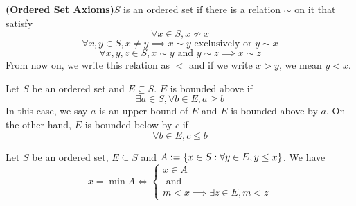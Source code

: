 \documentclass{report}
\begin{document}
\begin{definition}
\textbf{(Ordered Set Axioms)}$S$ is an ordered set if there is a relation $\sim$ on it that satisfy 
\begin{equation}
\forall x\in S, x\not\sim x
\end{equation}
\begin{equation}
\forall x,y\in S, x\neq y\implies x\sim y \text{ exclusively or }y\sim x
\end{equation}
\begin{equation}
  \forall x,y,z\in S, x\sim y \text{ and }y\sim z\implies x\sim z
\end{equation}
From now on, we write this relation as $<$ and if we write  $x>y$, we mean $y<x$.
\end{definition}
\begin{definition}
Let $S$ be an ordered set and $E\subseteq S$. $E$ is bounded above if 
\begin{equation}
\exists a\in S, \forall b\in E, a\geq b 
\end{equation}
In this case, we say $a$ is an upper bound of $E$ and $E$ is bounded above by $a$. On the other hand, $E$ is bounded below by $c$ if
\begin{equation}
\forall b\in E, c\leq b
\end{equation}
\end{definition}
\begin{theorem}
Let $S$ be an ordered set, $E\subseteq S$ and $A:=\{ x\in S: \forall y\in E, y\leq x \}$. We have
\begin{equation}
x=\min A\iff \begin{cases}
  x\in A \\
  \text{ and }\\
  m<x\implies \exists z\in E, m< z
\end{cases}
\end{equation}
\end{theorem}
\end{document}
